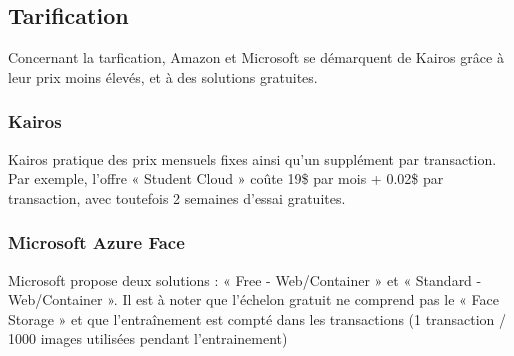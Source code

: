 \subsection{Tarification}

Concernant la tarfication, Amazon et Microsoft se démarquent de Kairos grâce à leur prix moins élevés, et à des
solutions gratuites.

\subsubsection{Kairos}

Kairos pratique des prix mensuels fixes ainsi qu’un supplément par transaction. Par exemple, l’offre « Student
Cloud » coûte 19\$ par mois + 0.02\$ par transaction, avec toutefois 2 semaines d’essai gratuites.

\subsubsection{Microsoft Azure Face}\cite{PRICEAZURE}

Microsoft propose deux solutions : « Free - Web/Container » et « Standard - Web/Container ». Il est à noter que l'échelon gratuit ne comprend pas le « Face Storage » et que l’entraînement est compté dans les transactions (1
transaction / 1000 images utilisées pendant l’entrainement)


